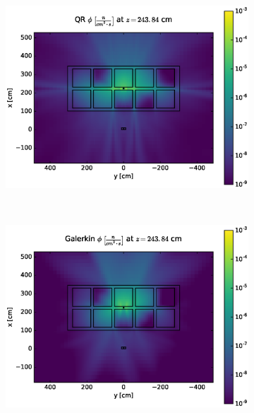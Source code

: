 \documentclass{article} %
\begin{document}
\clearpage
\begin{figure}[!htb]
\begin{subfigure}{\textwidth}
\centering
\includegraphics[max height=0.445\textheight]
{img/portal-fwd-flux-qr04.eps}
\end{subfigure}
\\
\begin{subfigure}{\textwidth}
\centering
\includegraphics[max height=0.445\textheight]
{img/portal-fwd-flux-gkn04.eps}
\end{subfigure}
\end{figure}
\clearpage
\end{document}
